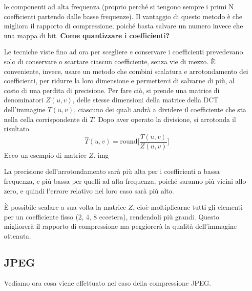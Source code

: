 \documentclass[a4paper,11pt]{article}
\begin{document}
le componenti ad alta frequenza (proprio perché si tengono sempre i primi N coefficienti partendo dalle basse frequenze).
Il vantaggio di questo metodo è che migliora il rapporto di compressione, poiché basta salvare un numero invece che una mappa di bit.
\newline
\newline
\textbf{Come quantizzare i coefficienti?}
\par
Le tecniche viste fino ad ora per scegliere e conservare i coefficienti prevedevano solo di conservare o scartare ciascun coefficiente, senza vie di mezzo.
È conveniente, invece, usare un metodo che combini scalatura e arrotondamento dei coefficienti, per ridurre la loro dimensione e permetterci di salvarne di più, al costo di una perdita di precisione.
Per fare ciò, si prende una matrice di denominatori $Z(u,v)$, delle stesse dimensioni della matrice della DCT dell'immagine $T(u,v)$, ciascuno dei quali andrà a dividere il coefficiente che sta nella cella
corrispondente di $T$. Dopo aver operato la divisione, si arrotonda il risultato.
\[
\hat{T}(u,v) = \text{round}\Bigg[ \frac{T(u,v)}{Z(u,v)} \Bigg]
\]
Ecco un esempio di matrice $Z$.
img
\par
La precisione dell'arrotondamento sarà più alta per i coefficienti a bassa frequenza, e più bassa per quelli ad alta frequenza, poiché saranno più vicini allo zero, e quindi l'errore relativo
nel loro caso sarà più alto.
\par
È possibile scalare a sua volta la matrice $Z$, cioè moltiplicarne tutti gli elementi per un coefficiente fisso (2, 4, 8 eccetera), rendendoli più grandi.
Questo migliorerà il rapporto di compressione ma peggiorerà la qualità dell'immagine ottenuta.

\subsection{JPEG}
Vediamo ora cosa viene effettuato nel caso della compressione JPEG.
\end{document}
